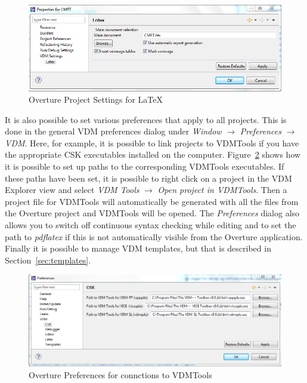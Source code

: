 \documentclass{overturerepchap}
\begin{document}
\begin{figure}[!hbt]
\begin{center}
  \includegraphics[width=\textwidth]{screendumps/projectsettingslatex}
  \caption[Overture Project Settings]{Overture Project Settings for \LaTeX}
  \label{fig:VDMSettingsLatex}
\end{center}
\end{figure}

It is also possible to set various preferences that apply to
all projects. This is done in the general VDM preferences dialog under
\emph{Window} $\rightarrow$ \emph{Preferences} $\rightarrow$
\emph{VDM}. Here, for example, it is possible to link projects to
VDMTools if you have the appropriate CSK executables installed on
the computer. Figure~\ref{fig:CSKPreferences} shows how it is possible to
set up paths to the corresponding VDMTools executables. If these paths have
been set, it is possible to right click on a project in the VDM
Explorer view and select \emph{VDM Tools} $\rightarrow$
\emph{Open project in VDMTools}. Then a project file for VDMTools
will automatically be generated with all the files from the Overture project
and VDMTools will be opened. The \emph{Preferences} dialog also
allows you to switch off continuous syntax checking while editing and
to set the path to \emph{pdflatex} if this is not automatically
visible from the Overture application. Finally it is possible to 
manage VDM templates, but that is described in Section~\ref{sec:templates}. 

\begin{figure}[!hbt]
\begin{center}
  \includegraphics[width=\textwidth]{screendumps/CSKPreferences}
  \caption{Overture Preferences for connctions to VDMTools}
  \label{fig:CSKPreferences}
\end{center}
\end{figure}
\end{document}
